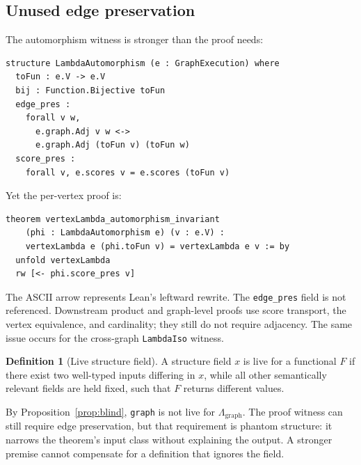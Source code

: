 \documentclass[10pt,letterpaper]{article}
\theoremstyle{definition}
\newtheorem{definition}[theorem]{Definition}
\newcommand{\Lgraph}{\Lambda_{\mathrm{graph}}}
\begin{document}
\subsection{Unused edge preservation}
The automorphism witness is stronger than the proof needs:
\begin{lstlisting}[language={},caption={The witness contains edge and score preservation.}]
structure LambdaAutomorphism (e : GraphExecution) where
  toFun : e.V -> e.V
  bij : Function.Bijective toFun
  edge_pres :
    forall v w,
      e.graph.Adj v w <->
      e.graph.Adj (toFun v) (toFun w)
  score_pres :
    forall v, e.scores v = e.scores (toFun v)
\end{lstlisting}
Yet the per-vertex proof is:
\begin{lstlisting}[language={},caption={The proof consumes score preservation, not edge preservation.}]
theorem vertexLambda_automorphism_invariant
    (phi : LambdaAutomorphism e) (v : e.V) :
    vertexLambda e (phi.toFun v) = vertexLambda e v := by
  unfold vertexLambda
  rw [<- phi.score_pres v]
\end{lstlisting}
The ASCII arrow represents Lean's leftward rewrite. The
\texttt{edge\_pres} field is not referenced. Downstream product and graph-level
proofs use score transport, the vertex equivalence, and cardinality; they still
do not require adjacency. The same issue occurs for the cross-graph
\texttt{LambdaIso} witness.

\begin{definition}[Live structure field]
A structure field \(x\) is live for a functional \(F\) if there exist two
well-typed inputs differing in \(x\), while all other semantically relevant
fields are held fixed, such that \(F\) returns different values.
\end{definition}
By Proposition~\ref{prop:blind}, \texttt{graph} is not live for
\(\Lgraph\). The proof witness can still require edge preservation, but that
requirement is phantom structure: it narrows the theorem's input class without
explaining the output. A stronger premise cannot compensate for a definition
that ignores the field.
\end{document}
